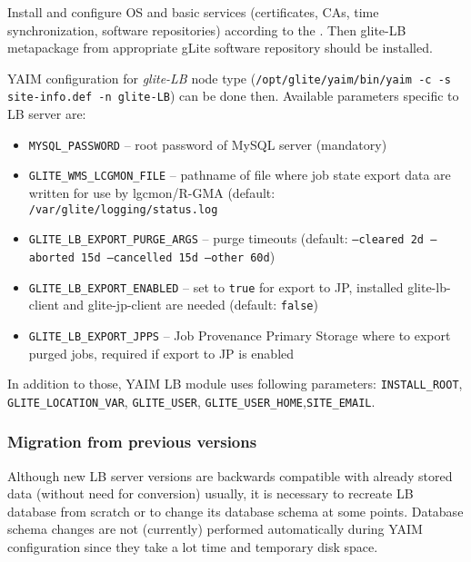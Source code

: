 Install and configure OS and basic services (certificates, CAs, time synchronization, software repositories) according to the . Then glite-LB metapackage from appropriate gLite software repository should be installed.

YAIM configuration for \emph{glite-LB} node type 
(\texttt{/opt/glite/yaim/bin/yaim -c -s site-info.def -n glite-LB}) 
can be done then. Available parameters specific to LB server are:

\begin{itemize}
\item \texttt{MYSQL\_PASSWORD} -- root password of MySQL server (mandatory)
\item \texttt{GLITE\_WMS\_LCGMON\_FILE} -- pathname of file where job state
export data are written for use by lgcmon/R-GMA 
(default: \texttt{/var/glite/logging/status.log}
\item \texttt{GLITE\_LB\_EXPORT\_PURGE\_ARGS} -- purge timeouts (default: \texttt{--cleared 2d --aborted 15d --cancelled 15d --other 60d})
\item \texttt{GLITE\_LB\_EXPORT\_ENABLED} -- set to \texttt{true} for export to JP, installed glite-lb-client and glite-jp-client are needed (default: \texttt{false})
\item \texttt{GLITE\_LB\_EXPORT\_JPPS} -- Job Provenance Primary Storage where to export purged jobs, required if export to JP is enabled
\end{itemize}

In addition to those, YAIM LB module uses following parameters:
\texttt{INSTALL\_ROOT}, \texttt{GLITE\_LOCATION\_VAR}, \texttt{GLITE\_USER}, \texttt{GLITE\_USER\_HOME},\texttt{SITE\_EMAIL}.

\subsubsection{Migration from previous versions}

Although new LB server versions are backwards compatible with already 
stored data (without need for conversion) usually, it is necessary to recreate
LB database from scratch or to change its database schema at some points.
Database schema changes are not (currently) performed automatically 
during YAIM configuration since they take a lot time and temporary disk
space.  

